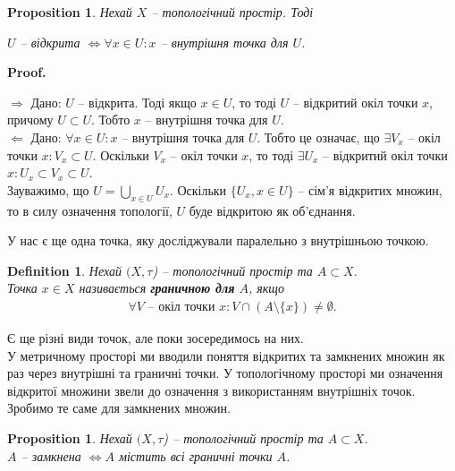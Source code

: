 \documentclass[a4paper, 10pt]{article}
\makeatletter
\def\rightproof{$\boxed{\Rightarrow}$ }
\def\leftproof{$\boxed{\Leftarrow}$ }
\theoremstyle{theoremdd}
\newtheorem{definition}[theorem]{Definition}
\newtheorem{proposition}[theorem]{Proposition}
\renewenvironment{proof}[1][Proof.\\]{\par
\pushQED{\hfill \qed}%
\normalfont \topsep6\p@\@plus6\p@\relax
\trivlist
\item\relax
{\bfseries
#1\@addpunct{.}}\hspace\labelsep\ignorespaces
}{%
\popQED\endtrivlist\@endpefalse
}
\makeatother
\begin{document}
\begin{proposition}
Нехай $X$ -- топологічний простір. Тоді
\begin{center}
$U$ -- відкрита $\iff \forall x \in U: x$ -- внутрішня точка для $U$.
\end{center}
\end{proposition}

\begin{proof}
\rightproof Дано: $U$ -- відкрита. Тоді якщо $x \in U$, то тоді $U$ -- відкритий окіл точки $x$, причому $U \subset U$. Тобто $x$ -- внутрішня точка для $U$.
\bigskip \\
\leftproof Дано: $\forall x \in U: x$ -- внутрішня точка для $U$. Тобто це означає, що $\exists V_x$ -- окіл точки $x: V_x \subset U$. Оскільки $V_x$ -- окіл точки $x$, то тоді $\exists U_x$ -- відкритий окіл точки $x: U_x \subset V_x \subset U$.\\
Зауважимо, що $U = \displaystyle\bigcup_{x \in U} U_x$. Оскільки $\{U_x, x \in U\}$ -- сім'я відкритих множин, то в силу означення топології, $U$ буде відкритою як об'єднання.
\end{proof}

\noindent
У нас є ще одна точка, яку досліджували паралельно з внутрішньою точкою.

\begin{definition}
Нехай $(X,\tau$) -- топологічний простір та $A \subset X$.\\
Точка $x \in X$ називається \textbf{граничною для} $A$, якщо
\begin{align*}
\forall V \text{ -- окіл точки } x: V \cap (A \setminus \{x\}) \neq \emptyset.
\end{align*}
\end{definition}
\noindent Є ще різні види точок, але поки зосередимось на них.\\
У метричному просторі ми вводили поняття відкритих та замкнених множин як раз через внутрішні та граничні точки. У топологічному просторі ми означення відкритої множини звели до означення з використанням внутрішніх точок. Зробимо те саме для замкнених множин.

\begin{proposition}
Нехай $(X,\tau$) -- топологічний простір та $A \subset X$.\\
$A$ -- замкнена $\iff A$ містить всі граничні точки $A$.
\end{proposition}
\end{document}
